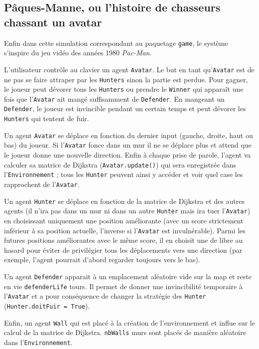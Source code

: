 \documentclass[a4paper]{article}
\begin{document}
\subsection{Pâques-Manne, ou l'histoire de chasseurs chassant un avatar}
Enfin dans cette simulation correspondant au paquetage \texttt{game}, le système s'inspire du jeu vidéo des années 1980 \textit{Pac-Man}. 

\medskip
L'utilisateur contrôle au clavier un agent \texttt{Avatar}. Le but en tant qu'\texttt{Avatar} est de ne pas se faire attraper par les \texttt{Hunters} sinon la partie est perdue. Pour gagner, le joueur peut dévorer tous les \texttt{Hunters} ou prendre le \texttt{Winner} qui apparaît une fois que l'\texttt{Avatar} ait mangé suffisamment de \texttt{Defender}. En mangeant un \texttt{Defender}, le joueur est invincible pendant un certain temps et peut dévorer les \texttt{Hunters} qui tentent de fuir.

\medskip
Un agent \texttt{Avatar} se déplace en fonction du dernier input (gauche, droite, haut ou bas) du joueur. Si l'\texttt{Avatar} fonce dans un mur il ne se déplace plus et attend que le joueur donne une nouvelle direction. Enfin à chaque prise de parole, l'agent va calculer sa matrice de Dijkstra (\texttt{Avatar.update()}) qui sera enregistrée dans l'\texttt{Environnement} ; tous les \texttt{Hunter} peuvent ainsi y accéder et voir quel case les rapprochent de l'\texttt{Avatar}.

\medskip
Un agent \texttt{Hunter} se déplace en fonction de la matrice de Dijkstra et des autres agents (il n'ira pas dans un mur ni dans un autre \texttt{Hunter} mais ira tuer l'\texttt{Avatar}) en choisissant uniquement une position améliorante (avec un score strictement inférieur à sa position actuelle, l'inverse si l'\texttt{Avatar} est invulnérable). Parmi les futures positions améliorantes avec le même score, il en choisit une de libre au hasard pour éviter de privilégier tous les déplacements vers une direction (par exemple, l'agent pourrait d'abord regarder toujours vers le bas).

\medskip
Un agent \texttt{Defender} apparait à un emplacement aléatoire vide sur la map et reste en vie \texttt{defenderLife} tours. Il permet de donner une invincibilité temporaire à l'\texttt{Avatar} et a pour conséquence de changer la stratégie des \texttt{Hunter} (\texttt{Hunter.doitFuir = True}).

\medskip
Enfin, un agent \texttt{Wall} qui est placé à la création de l'environnement et influe sur le calcul de la matrice de Dijkstra. \texttt{nbWalls} murs sont placés de manière aléatoire dans l'\texttt{Environnement}.
\end{document}

